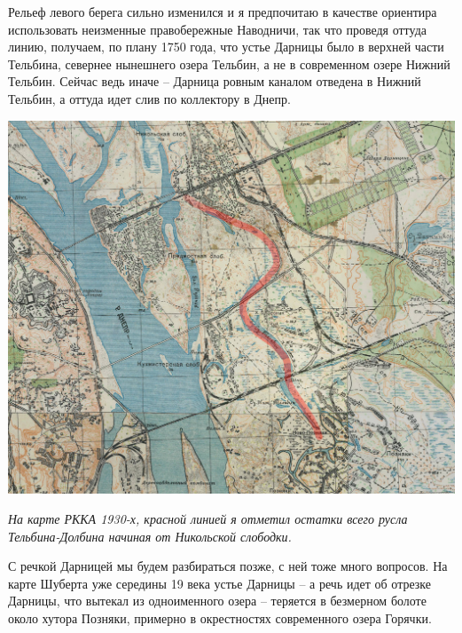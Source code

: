Рельеф левого берега сильно изменился и я предпочитаю в качестве ориентира использовать неизменные правобережные Наводничи, так что проведя оттуда линию, получаем, по плану 1750 года, что устье Дарницы было в верхней части Тельбина, севернее нынешнего озера Тельбин, а не в современном озере Нижний Тельбин. Сейчас ведь иначе – Дарница ровным каналом отведена в Нижний Тельбин, а оттуда идет слив по коллектору в Днепр.



\begin{center}
\includegraphics[width=\linewidth]{chast-gorodki/terbin/rkka-telbin-s.jpg}

\textit{На карте РККА 1930-х, красной линией я отметил остатки всего русла Тельбина-Долбина начиная от Никольской слободки.}
\end{center}

С речкой Дарницей мы будем разбираться позже, с ней тоже много вопросов. На карте Шуберта уже середины 19 века устье Дарницы – а речь идет об отрезке Дарницы, что вытекал из одноименного озера – теряется в безмерном болоте около хутора Позняки, примерно в окрестностях современного озера Горячки.

